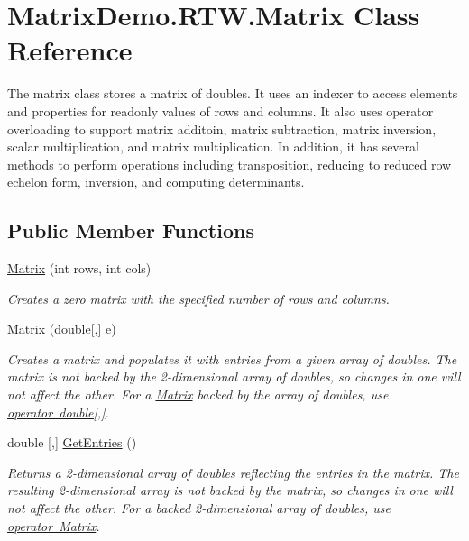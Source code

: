 \hypertarget{class_matrix_demo_1_1_r_t_w_1_1_matrix}{}\section{Matrix\+Demo.\+R\+T\+W.\+Matrix Class Reference}
\label{class_matrix_demo_1_1_r_t_w_1_1_matrix}


The matrix class stores a matrix of doubles. It uses an indexer to access elements and properties for readonly values of rows and columns. It also uses operator overloading to support matrix additoin, matrix subtraction, matrix inversion, scalar multiplication, and matrix multiplication. In addition, it has several methods to perform operations including transposition, reducing to reduced row echelon form, inversion, and computing determinants.  


\subsection*{Public Member Functions}
\begin{DoxyCompactItemize}
\item 
\mbox{\hyperlink{class_matrix_demo_1_1_r_t_w_1_1_matrix_a8c22efc901ad89be3078a180a7ac15d0}{Matrix}} (int rows, int cols)
\begin{DoxyCompactList}\small\item\em Creates a zero matrix with the specified number of rows and columns. \end{DoxyCompactList}\item 
\mbox{\hyperlink{class_matrix_demo_1_1_r_t_w_1_1_matrix_ad2a320fd0c86551f34070679fd43433c}{Matrix}} (double\mbox{[},\mbox{]} e)
\begin{DoxyCompactList}\small\item\em Creates a matrix and populates it with entries from a given array of doubles. The matrix is not backed by the 2-\/dimensional array of doubles, so changes in one will not affect the other. For a \mbox{\hyperlink{class_matrix_demo_1_1_r_t_w_1_1_matrix}{Matrix}} backed by the array of doubles, use \mbox{\hyperlink{class_matrix_demo_1_1_r_t_w_1_1_matrix_ac23641ac04b3c3baf14174bdf9049db2}{operator double\mbox{[},\mbox{]}}}. \end{DoxyCompactList}\item 
double \mbox{[},\mbox{]} \mbox{\hyperlink{class_matrix_demo_1_1_r_t_w_1_1_matrix_a9f6f8e0e7acfbdd55852f258daf68b8f}{Get\+Entries}} ()
\begin{DoxyCompactList}\small\item\em Returns a 2-\/dimensional array of doubles reflecting the entries in the matrix. The resulting 2-\/dimensional array is not backed by the matrix, so changes in one will not affect the other. For a backed 2-\/dimensional array of doubles, use \mbox{\hyperlink{class_matrix_demo_1_1_r_t_w_1_1_matrix_a0c737f7e6b54edac4d26b4f1c595ee92}{operator Matrix}}. \end{DoxyCompactList}\end{DoxyCompactItemize}
